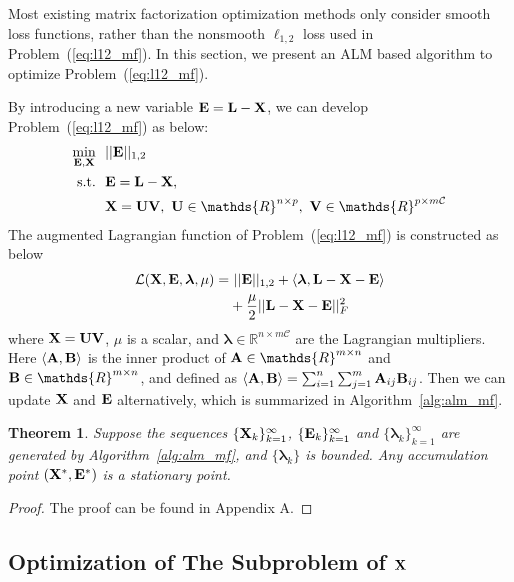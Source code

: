 \documentclass[10pt,twocolumn,letterpaper]{article}
\newtheorem{theorem}{Theorem}
\def\bB{{\bf B}}
\def\bE{{\bf E}}
\def\blambda{{\bm \lambda}}
\def\calL{{\mathcal{L}}}
\def\calC{{\mathcal{C}}}
\def\bL{{\bf L}}
\def\bU{{\bf U}}
\def\bV{{\bf V}}
\def\dsR{\mathds{R}}
\def\bX{{\bf X}}
\def\bA{{\bf A}}
\def\bX{{\bf X}}
\def\st{{\text{s.t.}}}
\begin{document}
Most existing matrix factorization optimization methods only consider smooth loss functions, rather than the nonsmooth $\ell_{1,2}$ loss used in Problem~(\ref{eq:l12_mf}).
In this section, we present an ALM based algorithm to optimize Problem~(\ref{eq:l12_mf}).



By introducing a new variable $\bE = \bL - \bX$, we can develop Problem~(\ref{eq:l12_mf}) as below:
{\small
\begin{align}\label{eq:mf_l21_constrained}
  \min_{\bE, \bX} ~&~ || \bE ||_{1,2}      \nonumber \\
  \st             ~&~ \bE = \bL - \bX  ,   \nonumber \\
                  ~&~ \bX = \bU \bV,~\bU \in \dsR^{n \times p},~\bV \in \dsR^{p \times m \calC}
\end{align}
}
\noindent 
The augmented Lagrangian function of Problem~(\ref{eq:l12_mf}) is constructed as below
{\small
\begin{align}\label{eq:lagrangian_l21}
  \calL (\bX, \bE, \blambda, \mu) = &~ || \bE ||_{1,2} + \langle \blambda, \bL - \bX - \bE \rangle      \nonumber \\
                                    & + \frac{\mu}{2} || \bL - \bX - \bE ||_F^2
\end{align}
}
\noindent
where $\bX = \bU \bV$, $\mu$ is a scalar,
and $\blambda \in \dsR^{n \times m\calC}$ are the Lagrangian multipliers.
Here $\langle \bA, \bB \rangle$ is the inner product of $\bA \in \dsR^{m \times n}$ and $\bB \in \dsR^{m \times n}$, and defined as $\langle \bA, \bB \rangle = \sum_{i=1}^{n} \sum_{j=1}^{m} \bA_{ij} \bB_{ij}$.
Then we can update $\bX$ and $\bE$ alternatively, which is summarized in Algorithm~\ref{alg:alm_mf}.


\begin{theorem}
\label{theorem:alm_convergence}
  Suppose the sequences $\{\bX_k\}_{k=1}^{\infty}$, $\{\bE_k\}_{k=1}^{\infty}$ and $\{\blambda_k\}_{k=1}^{\infty}$ are generated by Algorithm~\ref{alg:alm_mf},
  and $\{\blambda_k\}$ is bounded. Any accumulation point $(\bX^*, \bE^*)$ is a stationary point.
\end{theorem}

\begin{proof}
\label{proof:proof_AA}
  The proof can be found in Appendix A.
\end{proof}


\subsection{Optimization of The Subproblem of $\bX$}
\end{document}
